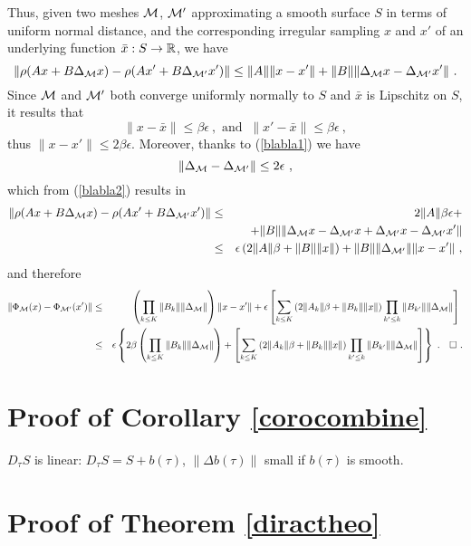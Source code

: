 Thus, given two meshes ${\mathcal{M}}$, ${\mathcal{M}}'$ approximating a smooth surface $S$ in terms of uniform normal distance, 
and the corresponding irregular sampling $x$ and $x'$ of an underlying function $\bar{x} : S \to {\mathbb{R}}$, we have 
\begin{equation}
\label{blabla2}
\| \rho( A x + B \Delta_{{\mathcal{M}}} x) - \rho( A x' + B \Delta_{{\mathcal{M}}'} x') \| \leq \| A \| \| x - x' \| + \|B \| \| \Delta_{\mathcal{M}} x - \Delta_{{\mathcal{M}}'} x' \|~.
\end{equation}
Since ${\mathcal{M}}$ and ${\mathcal{M}}'$ both converge uniformly normally to $S$ and $\bar{x}$ is Lipschitz on $S$, it results 
that 
$$\| x - \bar{x} \| \leq \beta \epsilon~,\text{ and }~\| x' - \bar{x} \| \leq \beta \epsilon~,$$
thus $\| x - x' \| \leq 2 \beta \epsilon$. 
Moreover, thanks to (\ref{blabla1}) we have 
$$\| \Delta_{{\mathcal{M}}} - \Delta_{{\mathcal{M}}'} \| \leq 2 \epsilon~, $$
which from (\ref{blabla2}) results in 
\begin{eqnarray}
\| \rho( A x + B \Delta_{{\mathcal{M}}} x) - \rho( A x' + B \Delta_{{\mathcal{M}}'} x') \| &\leq& 2 \| A \| \beta \epsilon +  \\
&& + \| B \| \| \Delta_{\mathcal{M}} x - \Delta_{{\mathcal{M}}'} x + \Delta_{{\mathcal{M}}'} x - \Delta_{{\mathcal{M}}'} x'  \| \nonumber \\
&\leq & \epsilon \left( 2 \|A \| \beta + \| B \| \|x\| \right) +  \| B \| \| \Delta_{{\mathcal{M}}'}\|  \|x - x' \| \nonumber ~,
\end{eqnarray}
and therefore 
\begin{eqnarray*}
\| \Phi_{\mathcal{M}}(x) - \Phi_{{\mathcal{M}}'}(x') \| &\leq& \left(\prod_{k \leq K} \|B_k \| \| \Delta_{{\mathcal{M}}} \| \right) \| x - x'\| + \epsilon \left[\sum_{k \leq K} \left( 2 \|A_k \| \beta + \| B_k \| \|x\| \right)  \prod_{k' \leq k} \|B_{k'} \| \| \Delta_{{\mathcal{M}}} \| \right]~ \\
&\leq& \epsilon \left\{2 \beta  \left(\prod_{k \leq K} \|B_k \| \| \Delta_{{\mathcal{M}}} \| \right) + \left[\sum_{k \leq K} \left( 2 \|A_k \| \beta + \| B_k \| \|x\| \right)  \prod_{k' \leq k} \|B_{k'} \| \| \Delta_{{\mathcal{M}}} \| \right]  \right\}~.~~~\square~.
\end{eqnarray*}


\section{Proof of Corollary \ref{corocombine}}

$D_\tau S$ is linear: $D_\tau S = S + b(\tau)$, 
$\| \Delta b(\tau) \|$ small if $b(\tau)$ is smooth.  


\section{Proof of Theorem \ref{diractheo}}




